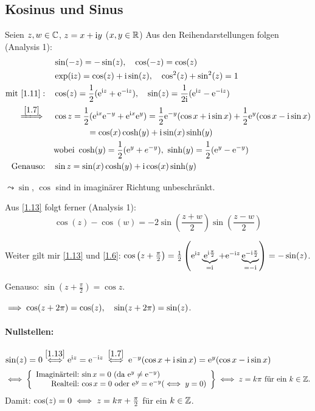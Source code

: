 \documentclass[a4paper,twoside,DIV15,BCOR12mm]{scrbook}
\begin{document}
\subsection{Kosinus und Sinus}

Seien $z,w\in\mathbb{C}$, $z = x +\mathrm{i} y$ ($x,y\in\mathbb{R}$) Aus den Reihendarstellungen folgen (Analysis 1):
\begin{align}
\label{1.11}&\sin(-z) = -\sin(z),\quad \cos(-z) = \cos(z)\\
\label{1.12}&\exp(\i z) = \cos(z)+\i\sin(z),\quad\cos^2(z)+\sin^2(z)=1\\
\label{1.13}\text{mit }\eqref{1.11}:\quad&\cos(z) = \frac{1}{2}(\e^{\i z} + \e^{-\i z}),\quad\sin(z) = \frac{1}{2\i}(\e^{\i z} - \e^{-\i z})\\
\folgtwegen{\eqref{1.7}}\quad&\cos z = \frac{1}{2}(\e^{\i x}\e^{-y}+\e^{\i x}\e^y) = \frac{1}{2}\e^{-y}(\cos x + \i\sin x) + \frac{1}{2}\e^y(\cos x-\i\sin x)\nonumber\\
&\qquad\qquad=\cos(x)\cosh(y)+\i\sin(x)\sinh(y)\label{1.14}\\
&\text{wobei } \cosh(y) = \frac{1}{2}(\e^y+e^{-y}),\ \sinh(y) = \frac{1}{2}(\e^y-\e^{-y})\nonumber\\
\label{1.15}\text{Genauso:}\quad&\sin z = \sin(x)\cosh(y) + \i\cos(x)\sinh(y)
\end{align}

$\leadsto\sin$, $\cos$ sind in imaginärer Richtung unbeschränkt.

Aus \eqref{1.13} folgt ferner (Analysis 1):
\begin{equation}\label{1.16}
\cos(z)-\cos(w) = -2\sin\left(\frac{z+w}{2}\right)\sin\left(\frac{z-w}{2}\right)
\end{equation}

Weiter gilt mir \eqref{1.13} und \eqref{1.6}: $\cos\left(z+\frac{\pi}{2}\right) = \frac{1}{2}\left(\mathrm{e}^{\mathrm{i} z}\underbrace{\mathrm{e}^{\mathrm{i}\frac{\pi}{2}}}_{=\mathrm{i}} + \mathrm{e}^{-\mathrm{i} z}\underbrace{\mathrm{e}^{-\mathrm{i}\frac{\pi}{2}}}_{=-\mathrm{i}}\right) = -\sin(z)$.

Genauso: $\sin(z+\frac{\pi}{2}) = \cos z$.

$\implies \cos (z+2\pi) = \cos (z),\quad\sin(z+2\pi)= \sin(z)$.

\paragraph{Nullstellen:} $\sin(z) = 0 \stackrel{\eqref{1.13}}{\iff} \mathrm{e}^{\mathrm{i} z} = \mathrm{e}^{-\mathrm{i} z} \stackrel{\eqref{1.7}}{\iff} \mathrm{e}^{-y} (\cos x + \mathrm{i}\sin x) = \mathrm{e}^y (\cos x -\mathrm{i}\sin x)$
\[\gdw \left\{\begin{array}{r @{:\ } l}\text{Imaginärteil}&\sin x = 0\  (\text{da } \e^y\neq\e^{-y})\\\text{Realteil}&\cos x = 0 \text{ oder } \e^y = \e^{-y} (\gdw y=0)\end{array}\right\} \gdw z = k\pi \text{ für ein } k\in\set{Z}.\]
Damit: $\cos(z) = 0\iff z = k\pi+\frac{\pi}{2}$ für ein $k\in\mathbb{Z}$.
\end{document}
